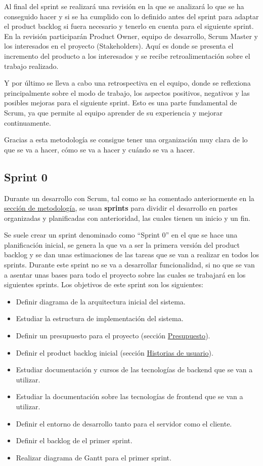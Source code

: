 Al final del sprint se realizará una revisión en la que se analizará lo que se ha conseguido hacer y si se ha cumplido con lo definido antes del sprint para adaptar el product backlog si fuera necesario y tenerlo en cuenta para el siguiente sprint. En la revisión participarán Product Owner, equipo de desarrollo, Scrum Master y los interesados en el proyecto (Stakeholders). Aquí es donde se presenta el incremento del producto a los interesados y se recibe retroalimentación sobre el trabajo realizado.

Y por último se lleva a cabo una retrospectiva en el equipo, donde se reflexiona principalmente sobre el modo de trabajo, los aspectos positivos, negativos y las posibles mejoras para el siguiente sprint. Esto es una parte fundamental de Scrum, ya que permite al equipo aprender de su experiencia y mejorar continuamente.

Gracias a esta metodología se consigue tener una organización muy clara de lo que se va a hacer, cómo se va a hacer y cuándo se va a hacer.

\subsection{Sprint 0}
\label{sec:planificacion-inicial}
Durante un desarrollo con Scrum, tal como se ha comentado anteriormente en la \hyperref[sec:metodologia]{sección de metodología}, se usan \textbf{sprints} para dividir el desarrollo en partes organizadas y planificadas con anterioridad, las cuales tienen un inicio y un fin.

Se suele crear un sprint denominado como ``Sprint 0'' en el que se hace una planificación inicial, se genera la que va a ser la primera versión del product backlog y se dan unas estimaciones de las tareas que se van a realizar en todos los sprints.
Durante este sprint no se va a desarrollar funcionalidad, si no que se van a asentar unas bases para todo el proyecto sobre las cuales se trabajará en los siguientes sprints.
Los objetivos de este sprint son los siguientes:

\begin{itemize}
    \item Definir diagrama de la arquitectura inicial del sistema.
    \item Estudiar la estructura de implementación del sistema.
    \item Definir un presupuesto para el proyecto (sección \hyperref[sec:presupuesto]{Presupuesto}).
    \item Definir el product backlog inicial (sección \hyperref[sec:historias-de-usuario]{Historias de usuario}).
    \item Estudiar documentación y cursos de las tecnologías de backend que se van a utilizar.
    \item Estudiar la documentación sobre las tecnologías de frontend que se van a utilizar.
    \item Definir el entorno de desarrollo tanto para el servidor como el cliente.
    \item Definir el backlog de el primer sprint.
    \item Realizar diagrama de Gantt para el primer sprint.
\end{itemize}


